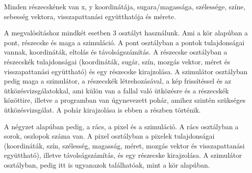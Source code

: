 Minden részecskének van x, y koordinátája, sugara/magassága, szélessége, színe, sebesség vektora, visszapattanási együtthatója és mérete. 

A megvalósításhoz mindkét esetben 3 osztályt használunk. Ami a kör alapúban a pont, részecske és maga a szimuláció. A pont osztályban a pontok tulajdonságai vannak, koordináták, eltolás és távolságszámítás.  A részecske osztályban  a részecskék tulajdonságai (koordináták, sugár, szín, mozgás vektor, méret és visszapattanási együttható) és egy részecske kirajzolása. A szimulátor osztályban pedig maga a szimulátor, a részecskék létrehozásával, a kép frissítéssel és az ütközésvizsgálatokkal, ami külön van a fallal való ütközésre és a részecskék közöttire, illetve a programban van úgynevezett pohár, amihez szintén szükséges ütközésvizsgálat. A pohár kirajzolása is ebben a részben történik.

A négyzet alapúban pedig, a rács, a pixel és a szimuláció. A rács osztályban a sorok, oszlopok száma van. A pixel osztályban a pixelek tulajdonságai (koordináták, szín, szélesség, magasság, méret, mozgás vektor és visszapattanási együttható), illetve távolságszámítás, és egy részecske kirajzolása. A szimulátor osztályban, pedig itt is ugyanazok találhatóak, mint a kör alapúban. 

